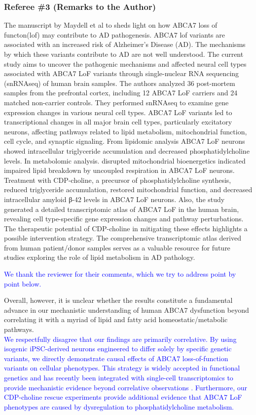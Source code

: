 \subsubsection{Referee \#3 (Remarks to the Author)}
The manuscript by Maydell et al to sheds light on how ABCA7 loss of functon(lof) may contribute to AD pathogenesis. ABCA7 lof variants are associated with an increased risk of Alzheimer's Disease (AD). The mechanisms by which these variants contribute to AD are not well understood. The current study aims to uncover the pathogenic mechanisms and affected neural cell types associated with ABCA7 LoF variants through single-nuclear RNA sequencing (snRNAseq) of human brain samples. The authors analyzed 36 post-mortem samples from the prefrontal cortex, including 12 ABCA7 LoF carriers and 24 matched non-carrier controls. They performed snRNAseq to examine gene expression changes in various neural cell types. ABCA7 LoF variants led to transcriptional changes in all major brain cell types, particularly excitatory neurons, affecting pathways related to lipid metabolism, mitochondrial function, cell cycle, and synaptic signaling. From lipidomic analysis ABCA7 LoF neurons showed intracellular triglyceride accumulation and decreased phosphatidylcholine levels. In metabolomic analysis. disrupted mitochondrial bioenergetics indicated impaired lipid breakdown by uncoupled respiration in ABCA7 LoF neurons. Treatment with CDP-choline, a precursor of phosphatidylcholine synthesis, reduced triglyceride accumulation, restored mitochondrial function, and decreased intracellular amyloid β-42 levels in ABCA7 LoF neurons. Also, the study generated a detailed transcriptomic atlas of ABCA7 LoF in the human brain, revealing cell type-specific gene expression changes and pathway perturbations. The therapeutic potential of CDP-choline in mitigating these effects highlights a possible intervention strategy. The comprehensive transcriptomic atlas derived from human patient/donor samples serves as a valuable resource for future studies exploring the role of lipid metabolism in AD pathology.

\textcolor{blue}{We thank the reviewer for their comments, which we try to address point by point below.}

Overall, however, it is unclear whether the results constitute a fundamental advance in our mechanistic understanding of human ABCA7 dysfunction beyond correlating it with a myriad of lipid and fatty acid homeostatic/metabolic pathways.\\
\textcolor{blue}{We respectfully disagree that our findings are primarily correlative. By using isogenic iPSC-derived neurons engineered to differ solely by specific genetic variants, we directly demonstrate causal effects of ABCA7 loss-of-function variants on cellular phenotypes. This strategy is widely accepted in functional genetics and has recently been integrated with single-cell transcriptomics to provide mechanistic evidence beyond correlative observations \cite{Haney2024-bp,Sun2023-fo}. Furthermore, our CDP-choline rescue experiments provide additional evidence that ABCA7 LoF phenotypes are caused by dysregulation to phosphatidylcholine metabolism.}

